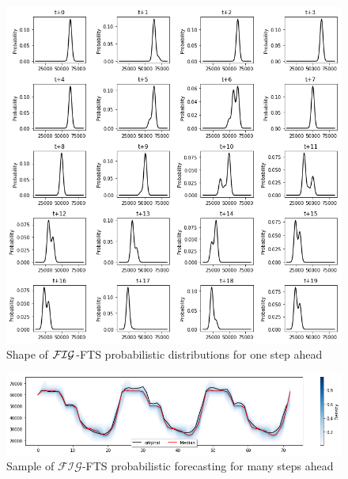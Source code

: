 \begin{figure}[htb]
    \centering
    \includegraphics[width=\textwidth]{figures/figfts_probabilistic_onestep_tiled.png}
    \caption{Shape of $\mathcal{FIG}$-FTS probabilistic distributions for one step ahead}
    \label{fig:figfts_probabilistic_onestep_tiled}
\end{figure}


\begin{figure}[htb]
    \centering
    \includegraphics[width=\textwidth]{figures/figfts_probabilistic_manystep.png}
    \caption{Sample of $\mathcal{FIG}$-FTS probabilistic forecasting for many steps ahead}
    \label{fig:figfts_probabilistic_manystep}
\end{figure}

